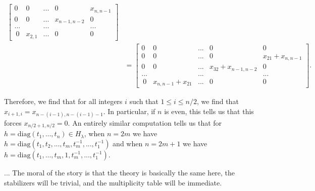 \documentclass{memoir}
\newcommand{\tx}{\text}
\theoremstyle{definition}
\begin{document}
\begin{align*}
\begin{bmatrix}
0 & 0 & ... & 0 & x_{n, n-1} \\
0 & 0 & ... & x_{n-1, n-2} & 0 \\
... & & ... & & ...\\\
0 & x_{2, 1} & ... & 0 & 0
\end{bmatrix}\\
&=\begin{bmatrix}
	0 & 0 & ... & 0 & 0 \\
	0 & 0 & ... & 0 & x_{21}+x_{n, n-1} \\
	0 & 0 & ... & x_{32}+x_{n-1, n-2} & 0 \\
	... & & ... & & ...\\\
	0 & x_{n, n-1}+x_{21} & ... & 0 & 0
\end{bmatrix}.
	\end{align*}
	
	Therefore, we find that for all integers $i$ such that $1\leq i\leq n/2$, we find that $x_{i+1, i}=x_{n-(i-1), n-(i-1)-1}$.  
	In particular, if $n$ is even, this tells us that this forces $x_{n/2+1, n/2}=0$.  
	An entirely similar computation tells us that for $h=\tx{diag}(t_1, ..., t_n)\in H_\lambda$, when $n=2m$ we have $h=\tx{diag}(t_1, t_2, ..., t_m, t_m^{-1}, ..., t_1^{-1})$ and when $n=2m+1$ we have $h=\tx{diag}(t_1, ..., t_m, 1, t_m^{-1}, ..., t_1^{-1})$.  
	
	... The moral of the story is that the theory is basically the same here, the stabilizers will be trivial, and the multiplicity table will be immediate. 
	
\end{document}
